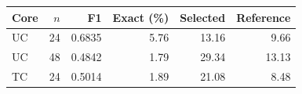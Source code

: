 \begin{tabular*}{\linewidth}{@{\extracolsep{\fill}}lrrrrr@{}}
\toprule
Core & $n$ & F1 & Exact (\%) & Selected & Reference\\
\midrule
UC & 24 & 0.6835 & 5.76 & 13.16 & 9.66\\
UC & 48 & 0.4842 & 1.79 & 29.34 & 13.13\\
TC & 24 & 0.5014 & 1.89 & 21.08 & 8.48\\
\bottomrule
\end{tabular*}

